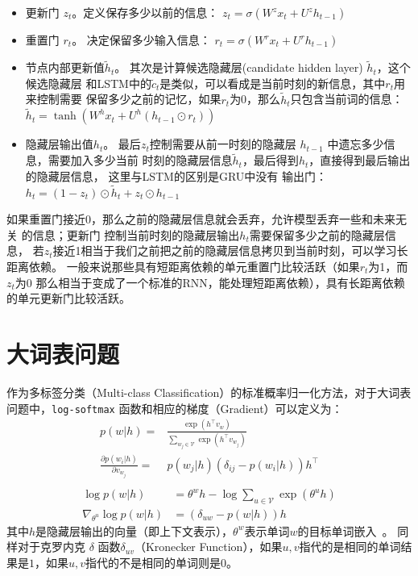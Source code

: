 \begin{itemize}
\item 更新门 $z_t$。定义保存多少以前的信息： $z_t = \sigma ( W^z x_t+ U^z h_{t-1}  )$

\item 重置门 $r_t$。 决定保留多少输入信息： $r_t = \sigma(W^r x_t  + U^r h_{t-1}  )$

\item 节点内部更新值$\tilde h_t $。 其次是计算候选隐藏层(candidate hidden layer) $\tilde h_t$，这个候选隐藏层 和LSTM中的$\tilde c_t$是类似，可以看成是当前时刻的新信息，其中$r_t$用来控制需要 保留多少之前的记忆，如果$r_t$为0，那么$\tilde h_t$只包含当前词的信息：$\tilde h_t  = \tanh (W^h x_t  + U^h(h_{t-1} \odot r_t) )$

\item 隐藏层输出值$h_t$。 最后$z_t$控制需要从前一时刻的隐藏层 $h_{t-1}$ 中遗忘多少信息，需要加入多少当前 时刻的隐藏层信息$\tilde h_t$，最后得到$h_t$，直接得到最后输出的隐藏层信息， 这里与LSTM的区别是GRU中没有 输出门：$h_t = (1-z_t)\odot \tilde h_t  + z_t \odot h_{t-1}$
\end{itemize}

如果重置门接近0，那么之前的隐藏层信息就会丢弃，允许模型丢弃一些和未来无关 的信息；更新门 控制当前时刻的隐藏层输出$h_t$需要保留多少之前的隐藏层信息， 若$z_t$接近1相当于我们之前把之前的隐藏层信息拷贝到当前时刻，可以学习长距离依赖。 一般来说那些具有短距离依赖的单元重置门比较活跃（如果$r_t$为1，而$z_t$为$0$ 那么相当于变成了一个标准的RNN，能处理短距离依赖），具有长距离依赖的单元更新门比较活跃。



\section{大词表问题}
作为多标签分类（Multi-class Classification）的标准概率归一化方法，对于大词表问题中，\texttt{log-softmax} 函数和相应的梯度（Gradient）可以定义为：
\begin{equation}
\begin{split}
p(w|h)=&\frac{\exp(h^\top v_{w})}{\sum_{w_j\in \mathcal{V}}{\exp(h^\top v_{w_j} )}} \\
\frac{\partial p(w_i|h)}{\partial v_{w_j}}=&p(w_j|h)(\delta_{ij}-p(w_i|h))h^\top\\
\end{split}
\end{equation}
\begin{equation}
\label{eq:softmax}
\begin{split}
\log p(w|h) &= \theta^w h-\log \sum_{u\in \mathcal{V}}{\exp(\theta^u h)}\\
\nabla_{\theta^u}{\log p(w|h)}&= (\delta_{uw}-p(w|h))h
\end{split}
\end{equation}
其中$ h $是隐藏层输出的向量（即上下文表示），$ \theta ^ w $表示单词$ w $的目标单词嵌入~。 同样对于克罗内克 $\delta$ 函数$ \delta_ {uv} $（Kronecker Function），如果$ u,v $指代的是相同的单词结果是$ 1 $，如果$ u,v $指代的不是相同的单词则是$ 0 $。


